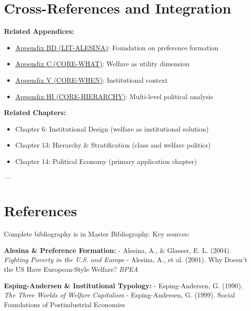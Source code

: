 \section{Cross-References and Integration}
\label{sec:crossref}

\textbf{Related Appendices:}

\begin{itemize}
\item \hyperref[app:lit-alesina]{Appendix BD (LIT-ALESINA)}: Foundation on preference formation
\item \hyperref[app:core-what]{Appendix C (CORE-WHAT)}: Welfare as utility dimension
\item \hyperref[app:core-when]{Appendix V (CORE-WHEN)}: Institutional context
\item \hyperref[app:core-hierarchy]{Appendix HI (CORE-HIERARCHY)}: Multi-level political analysis
\end{itemize}

\textbf{Related Chapters:}

\begin{itemize}
\item Chapter 6: Institutional Design (welfare as institutional solution)
\item Chapter 13: Hierarchy \& Stratification (class and welfare politics)
\item Chapter 14: Political Economy (primary application chapter)
\end{itemize}

---

\clearpage


\section{References}
\label{sec:references}

Complete bibliography is in Master Bibliography. Key sources:

\textbf{Alesina \& Preference Formation:}
- Alesina, A., \& Glaeser, E. L. (2004). \emph{Fighting Poverty in the U.S. and Europe}
- Alesina, A., et al. (2001). Why Doesn't the US Have European-Style Welfare? \emph{BPEA}

\textbf{Esping-Andersen \& Institutional Typology:}
- Esping-Andersen, G. (1990). \emph{The Three Worlds of Welfare Capitalism}
- Esping-Andersen, G. (1999). Social Foundations of Postindustrial Economies

